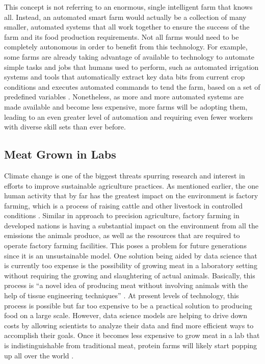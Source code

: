 \documentclass[sigconf]{acmart}
\begin{document}
This concept is not referring to an enormous, single intelligent farm that knows all. Instead, an automated smart farm would actually be a collection of many smaller, automated systems that all work together to ensure the success of the farm and its food production requirements. Not all farms would need to be completely autonomous in order to benefit from this technology. For example, some farms are already taking advantage of available to technology to automate simple tasks and jobs that humans used to perform, such as automated irrigation systems \cite{gutierrez2014} and tools that automatically extract key data bits from current crop conditions and executes automated commands to tend the farm, based on a set of predefined variables \cite{das2015}. Nonetheless, as more and more automated systems are made available and become less expensive, more farms will be adopting them, leading to an even greater level of automation and requiring even fewer workers with diverse skill sets than ever before.

\subsection{Meat Grown in Labs}

Climate change is one of the biggest threats spurring research and interest in efforts to improve sustainable agriculture practices. As mentioned earlier, the one human activity that by far has the greatest impact on the environment is factory farming, which is a process of raising cattle and other livestock in controlled conditions \cite{caro2014}. Similar in approach to precision agriculture, factory farming in developed nations is having a substantial impact on the environment from all the emissions the animals produce, as well as the resources that are required to operate factory farming facilities. This poses a problem for future generations since it is an unsustainable model. One solution being aided by data science that is currently too expense is the possibility of growing meat in a laboratory setting without requiring the growing and slaughtering of actual animals. Basically, this process is ``a novel idea of producing meat without involving animals with the help of tissue engineering techniques'' \cite{bhat2015}. At present levels of technology, this process is possible but far too expensive to be a practical solution to producing food on a large scale. However, data science models are helping to drive down costs by allowing scientists to analyze their data and find more efficient ways to accomplish their goals. Once it becomes less expensive to grow meat in a lab that is indistinguishable from traditional meat, protein farms will likely start popping up all over the world \cite{bhat2015}.
\end{document}
